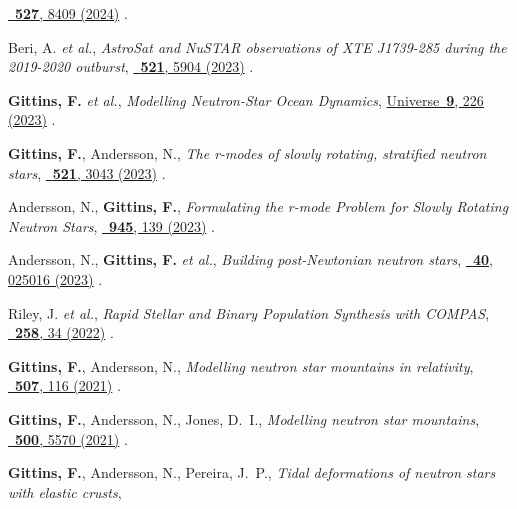 \begin{etaremune}[start=\value{pubCounter}]
    \href{https://doi.org/10.1093/mnras/stad3593}%
    {\mnras\ \textbf{527}, 8409 (2024)}
    .
    \item Beri, A. \textit{et al.},
    \textit{AstroSat and NuSTAR observations of XTE J1739-285 during the
    2019-2020 outburst},
    \href{https://doi.org/10.1093/mnras/stad902}%
    {\mnras\ \textbf{521}, 5904 (2023)}
    .
    \item \textbf{Gittins, F.} \textit{et al.},
    \textit{Modelling Neutron-Star Ocean Dynamics},
    \href{https://doi.org/10.3390/universe9050226}%
    {Universe\ \textbf{9}, 226 (2023)}
    .
    \item \textbf{Gittins, F.}, Andersson, N.,
    \textit{The r-modes of slowly rotating, stratified neutron stars},
    \href{https://doi.org/10.1093/mnras/stad672}%
    {\mnras\ \textbf{521}, 3043 (2023)}
    .
    \item Andersson, N., \textbf{Gittins, F.},
    \textit{Formulating the r-mode Problem for Slowly Rotating Neutron Stars},
    \href{https://doi.org/10.3847/1538-4357/acbc1e}%
    {\apj\ \textbf{945}, 139 (2023)}
    .
    \item Andersson, N., \textbf{Gittins, F.} \textit{et al.},
    \textit{Building post-Newtonian neutron stars},
    \href{https://doi.org/10.1088/1361-6382/acace5}%
    {\cqg\ \textbf{40}, 025016 (2023)}
    .
    \item Riley, J. \textit{et al.},
    \textit{Rapid Stellar and Binary Population Synthesis with COMPAS},
    \href{https://doi.org/10.3847/1538-4365/ac416c}%
    {\apjs\ \textbf{258}, 34 (2022)}
    .
    \item \textbf{Gittins, F.}, Andersson, N.,
    \textit{Modelling neutron star mountains in relativity},
    \href{https://doi.org/10.1093/mnras/stab2048}%
    {\mnras\ \textbf{507}, 116 (2021)}
    .
    \item \textbf{Gittins, F.}, Andersson, N., Jones, D.~I.,
    \textit{Modelling neutron star mountains},
    \href{https://doi.org/10.1093/mnras/staa3635}%
    {\mnras\ \textbf{500}, 5570 (2021)}
    .
    \item \textbf{Gittins, F.}, Andersson, N., Pereira, J.~P.,
    \textit{Tidal deformations of neutron stars with elastic crusts},

\end{etaremune}

